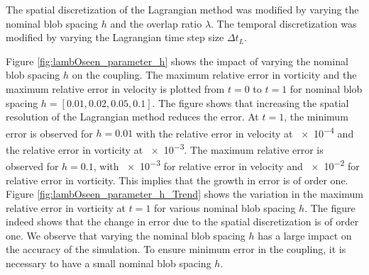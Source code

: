 The spatial discretization of the Lagrangian method was modified by varying the nominal blob spacing $h$ and the overlap ratio $\lambda$. The temporal discretization was modified by varying the Lagrangian time step size $\Delta t_L$. %





	
	
Figure \ref{fig:lambOseen_parameter_h} shows the impact of varying the nominal blob spacing $h$ on the coupling. The maximum relative error in vorticity and the maximum relative error in velocity is plotted from $t=0$ to $t=1$ for nominal blob spacing $h = [0.01,0.02,0.05,0.1]$. The figure shows that increasing the spatial resolution of the Lagrangian method reduces the error. At $t=1$, the minimum error is observed for $h=0.01$ with the relative error in velocity at \num{e-4} and the relative error in vorticity at \num{e-3}. The maximum relative error is observed for $h=0.1$, with \num{e-3} for relative error in velocity and \num{e-2} for relative error in vorticity. This implies that the growth in error is of order one. Figure \ref{fig:lambOseen_parameter_h_Trend} shows the variation in the maximum relative error in vorticity at $t=1$ for various nominal blob spacing $h$. The figure indeed shows that the change in error due to the spatial discretization is of order one. We observe that varying the nominal blob spacing $h$ has a large impact on the accuracy of the simulation. To ensure minimum error in the coupling, it is necessary to have a small nominal blob spacing $h$.

